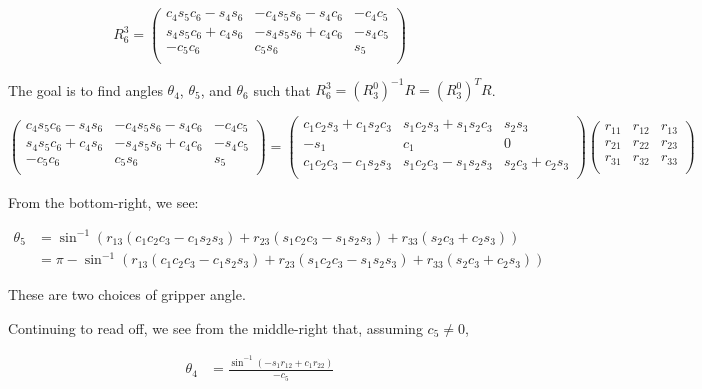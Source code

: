 \documentclass{article}
\begin{document}
\[ R^3_6 = 
	\left( \begin{matrix}
		c_4 s_5 c_6 - s_4 s_6 & -c_4 s_5 s_6 - s_4 c_6 & - c_4 c_5 \\
		s_4 s_5 c_6 + c_4 s_6 & -s_4 s_5 s_6 + c_4 c_6 & - s_4 c_5 \\
		-c_5 c_6 & c_5 s_6 & s_5 \\
	\end{matrix} \right) \]

The goal is to find angles $\theta_4$, $\theta_5$, and $\theta_6$
	such that $R^3_6 = (R_3^0)^{-1} R = (R_3^0)^T R$.

\[	\left( \begin{matrix}
		c_4 s_5 c_6 - s_4 s_6 & -c_4 s_5 s_6 - s_4 c_6 & - c_4 c_5 \\
		s_4 s_5 c_6 + c_4 s_6 & -s_4 s_5 s_6 + c_4 c_6 & - s_4 c_5 \\
		-c_5 c_6 & c_5 s_6 & s_5 \\
	\end{matrix} \right)
	=
	\left( \begin{matrix}
		c_1 c_2 s_3 + c_1 s_2 c_3 & s_1 c_2 s_3 + s_1 s_2 c_3  & s_2 s_3 \\
		 - s_1 & c_1 & 0 \\
		c_1 c_2 c_3 - c_1 s_2 s_3 & s_1 c_2 c_3 - s_1 s_2 s_3  & s_2 c_3 + c_2 s_3 \\
	\end{matrix} \right)
	\left( \begin{matrix}
		r_{11} & r_{12} & r_{13} \\
		r_{21} & r_{22} & r_{23} \\
		r_{31} & r_{32} & r_{33} \\
	\end{matrix} \right)  \]

From the bottom-right, we see:

\begin{align*}
\theta_5 & = \sin^{-1} \left(
		r_{13} ( c_1 c_2 c_3 - c_1 s_2 s_3 ) + r_{23} (s_1 c_2 c_3 - s_1 s_2 s_3)
			+ r_{33} ( s_2 c_3 + c_2 s_3 ) \right) \\
& = \pi - \sin^{-1} \left(
		r_{13} ( c_1 c_2 c_3 - c_1 s_2 s_3 ) + r_{23} (s_1 c_2 c_3 - s_1 s_2 s_3)
			+ r_{33} ( s_2 c_3 + c_2 s_3 ) \right) 
\end{align*}

These are two choices of gripper angle.

Continuing to read off, we see from the middle-right that, assuming $c_5 \neq 0$,

\begin{align*}
\theta_4 & = \frac{\sin^{-1} \left( -s_1 r_{12} + c_1 r_{22} \right) }{- c_5}
\end{align*}
\end{document}
